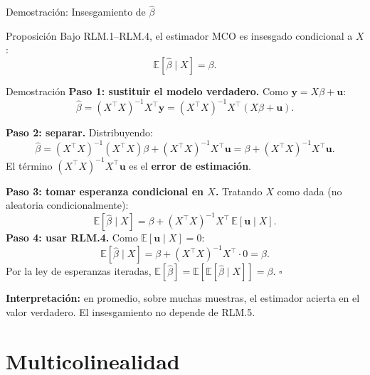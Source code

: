 \documentclass{beamer}
\begin{document}
\begin{frame}[allowframebreaks]{Demostración: Insesgamiento de $\hat{\beta}$}

\begin{alertblock}{Proposición}
Bajo RLM.1--RLM.4, el estimador MCO es insesgado condicional a $X$:
\[
\mathbb{E}[\hat{\beta}\mid X] = \beta.
\]
\end{alertblock}

\begin{exampleblock}{Demostración}
\textbf{Paso 1: sustituir el modelo verdadero.} Como $\mathbf{y} = X\beta + \mathbf{u}$:
\[
\hat{\beta} = (X^{\top}X)^{-1}X^{\top}\mathbf{y} = (X^{\top}X)^{-1}X^{\top}(X\beta + \mathbf{u}).
\]

\textbf{Paso 2: separar.} Distribuyendo:
\[
\hat{\beta} = (X^{\top}X)^{-1}(X^{\top}X)\beta + (X^{\top}X)^{-1}X^{\top}\mathbf{u}
            = \beta + (X^{\top}X)^{-1}X^{\top}\mathbf{u}.
\]
El término $(X^{\top}X)^{-1}X^{\top}\mathbf{u}$ es el \textbf{error de estimación}.

\framebreak

\textbf{Paso 3: tomar esperanza condicional en $X$.} Tratando $X$ como dada (no aleatoria condicionalmente):
\[
\mathbb{E}[\hat{\beta}\mid X] = \beta + (X^{\top}X)^{-1}X^{\top}\,\mathbb{E}[\mathbf{u}\mid X].
\]
\textbf{Paso 4: usar RLM.4.} Como $\mathbb{E}[\mathbf{u}\mid X]=0$:
\[
\mathbb{E}[\hat{\beta}\mid X] = \beta + (X^{\top}X)^{-1}X^{\top}\cdot 0 = \beta.
\]
Por la ley de esperanzas iteradas, $\mathbb{E}[\hat{\beta}] = \mathbb{E}[\mathbb{E}[\hat{\beta}\mid X]] = \beta$. \hfill $\square$
\end{exampleblock}

\textbf{Interpretación:} en promedio, sobre muchas muestras, el estimador acierta en el valor verdadero. El insesgamiento no depende de RLM.5.

\end{frame}

\section{Multicolinealidad}
\end{document}
